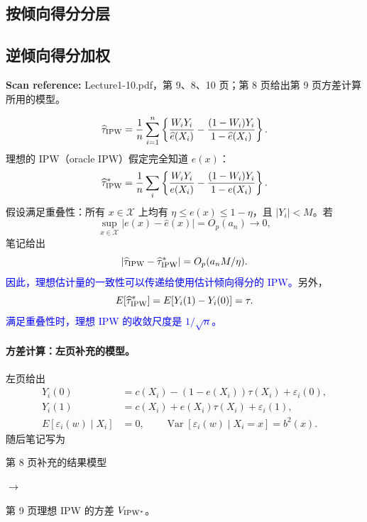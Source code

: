 \documentclass[11pt,a4paper]{article}
\newcommand{\sourcepages}[1]{\par{\small\sffamily\color{muted}\textbf{Scan reference:} #1\par}\nobreak\smallskip\nopagebreak[4]}
\newcommand{\inkblue}[1]{\textcolor{blue}{#1}}
\newcommand{\notearrow}[3]{%
\par\Needspace{6\baselineskip}\smallskip
\noindent\begin{minipage}[c]{0.43\linewidth}\raggedright\color{#1}#2\end{minipage}%
\hfill\textcolor{#1}{\(\longrightarrow\)}\hfill%
\begin{minipage}[c]{0.43\linewidth}\raggedright#3\end{minipage}\par\smallskip}
\newenvironment{reviewnote}[4]{%
\par\Needspace{6\baselineskip}\medskip\begingroup
\ifstrequal{#1}{original}{\color{ReviewPurple}\ifdefined\ChineseEdition\def\reviewkind{原笔记纠错}\else\def\reviewkind{Original-note correction}\fi}%
{\color{ReviewOrange}\ifdefined\ChineseEdition\def\reviewkind{补充条件／待确认}\else\def\reviewkind{Qualification / unresolved point}\fi}%
\noindent\rule{\linewidth}{0.45pt}\par\nobreak
\noindent\textbf{\reviewkind\ (#2): #3}\par\nobreak
{\small\textit{\ifdefined\ChineseEdition 来源：\else Source: \fi #4}\par}\nobreak\smallskip
}{\par\nobreak\smallskip\noindent\rule{\linewidth}{0.45pt}\par\endgroup\medskip}
\begin{document}
\subsection{按倾向得分分层}
\subsection{逆倾向得分加权}
\sourcepages{Lecture1-10.pdf，第 9、8、10 页；第 8 页给出第 9 页方差计算所用的模型。}
\[
\widehat\tau_{\rm IPW}=\frac1n\sum_{i=1}^n
\left\{\frac{W_iY_i}{\widehat e(X_i)}-\frac{(1-W_i)Y_i}{1-\widehat e(X_i)}\right\}.
\]
理想的 IPW（oracle IPW）假定完全知道 $e(x)$：
\[
\widehat\tau^*_{\rm IPW}=\frac1n\sum_i
\left\{\frac{W_iY_i}{e(X_i)}-\frac{(1-W_i)Y_i}{1-e(X_i)}\right\}.
\]
假设满足重叠性：所有 $x\in\mathcal X$ 上均有 $\eta\leq e(x)\leq1-\eta$，且 $|Y_i|<M$。若
\[
\sup_{x\in\mathcal X}|e(x)-\widehat e(x)|=O_p(a_n)\longrightarrow0,
\]
笔记给出
\[
|\widehat\tau_{\rm IPW}-\widehat\tau^*_{\rm IPW}|=O_p(a_nM/\eta).
\]
\inkblue{因此，理想估计量的一致性可以传递给使用估计倾向得分的 IPW。}另外，
\[
E[\widehat\tau^*_{\rm IPW}]=E[Y_i(1)-Y_i(0)]=\tau.
\]
\inkblue{满足重叠性时，理想 IPW 的收敛尺度是 $1/\sqrt n$。}
\paragraph{方差计算：左页补充的模型。}
左页给出
\begin{align*}
Y_i(0)&=c(X_i)-(1-e(X_i))\tau(X_i)+\varepsilon_i(0),\\
Y_i(1)&=c(X_i)+e(X_i)\tau(X_i)+\varepsilon_i(1),\\
E[\varepsilon_i(w)\mid X_i]&=0,\qquad
\operatorname{Var}[\varepsilon_i(w)\mid X_i=x]=b^2(x).
\end{align*}
随后笔记写为
\notearrow{black}{第 8 页补充的结果模型}{第 9 页理想 IPW 的方差 $V_{\rm IPW^*}$。}
\end{document}
